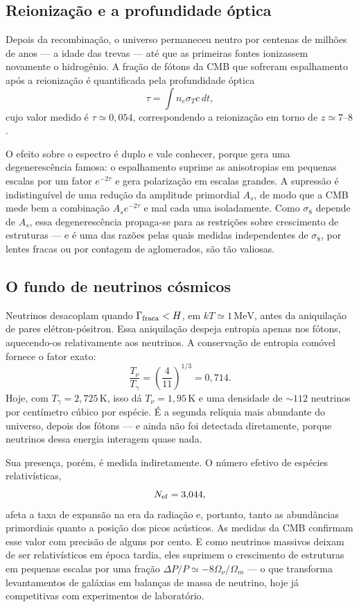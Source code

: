 \documentclass[11pt,a4paper]{article}
\begin{document}
\subsection*{Reionização e a profundidade óptica}

Depois da recombinação, o universo permaneceu neutro por centenas de milhões de anos --- a idade das trevas --- até que as primeiras fontes ionizassem novamente o hidrogênio. A fração de fótons da CMB que sofreram espalhamento após a reionização é quantificada pela profundidade óptica
\[
\tau=\int n_e\sigma_Tc\,dt,
\]
cujo valor medido é $\tau\simeq0{,}054$, correspondendo a reionização em torno de $z\simeq7$--$8$.

O efeito sobre o espectro é duplo e vale conhecer, porque gera uma degenerescência famosa: o espalhamento suprime as anisotropias em pequenas escalas por um fator $e^{-2\tau}$ e gera polarização em escalas grandes. A supressão é indistinguível de uma redução da amplitude primordial $A_s$, de modo que a CMB mede bem a combinação $A_se^{-2\tau}$ e mal cada uma isoladamente. Como $\sigma_8$ depende de $A_s$, essa degenerescência propaga-se para as restrições sobre crescimento de estruturas --- e é uma das razões pelas quais medidas independentes de $\sigma_8$, por lentes fracas ou por contagem de aglomerados, são tão valiosas.

\subsection*{O fundo de neutrinos cósmicos}

Neutrinos desacoplam quando $\Gamma_{\rm fraca}<H$, em $kT\simeq1\,\mathrm{MeV}$, antes da aniquilação de pares elétron-pósitron. Essa aniquilação despeja entropia apenas nos fótons, aquecendo-os relativamente aos neutrinos. A conservação de entropia comóvel fornece o fator exato:
\[
\frac{T_\nu}{T_\gamma}=\left(\frac{4}{11}\right)^{1/3}=0{,}714.
\]
Hoje, com $T_\gamma=2{,}725\,\mathrm{K}$, isso dá $T_\nu=1{,}95\,\mathrm{K}$ e uma densidade de $\sim112$ neutrinos por centímetro cúbico por espécie. É a segunda relíquia mais abundante do universo, depois dos fótons --- e ainda não foi detectada diretamente, porque neutrinos dessa energia interagem quase nada.

Sua presença, porém, é medida indiretamente. O número efetivo de espécies relativísticas,
\[
N_{\rm ef}=3{,}044,
\]
afeta a taxa de expansão na era da radiação e, portanto, tanto as abundâncias primordiais quanto a posição dos picos acústicos. As medidas da CMB confirmam esse valor com precisão de alguns por cento. E como neutrinos massivos deixam de ser relativísticos em época tardia, eles suprimem o crescimento de estruturas em pequenas escalas por uma fração $\Delta P/P\simeq-8\Omega_\nu/\Omega_m$ --- o que transforma levantamentos de galáxias em balanças de massa de neutrino, hoje já competitivas com experimentos de laboratório.
\end{document}
